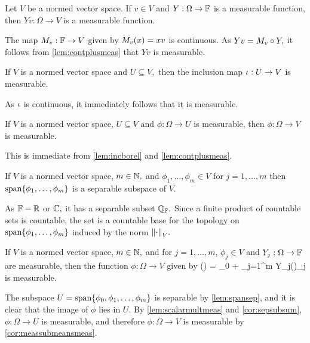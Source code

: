 \ble\label{lem:scalarmultmeas}
Let $V$ be a normed vector space. If $v \in V$ and $Y:\Omega\rightarrow \mathbb F$ is a measurable function, then $Yv:\Omega\rightarrow V$ is a measurable function.
\ele

The map $M_{v}:\mathbb F\rightarrow V$ given by $M_{v}(x) = xv$ is continuous. As $Yv = M_{v} \circ Y,$ it follows from \cref{lem:contplusmeas} that $Yv$ is measurable.
\epf

\ble\label{lem:incborel}
If $V$ is a normed vector space and $U \subseteq V,$ then the inclusion map $\iota:U\rightarrow V$ is measurable.
\ele

As $\iota$ is continuous, it immediately follows that it is measurable.
\epf

\bco\label{cor:meassubmeansmeas}
If $V$ is a normed vector space, $U\subseteq V$ and $\phi:\Omega\rightarrow U$ is measurable, then $\phi:\Omega\rightarrow V$ is measurable.
\eco

This is immediate from \cref{lem:incborel} and \cref{lem:contplusmeas}.
\epf

\ble\label{lem:spansep}
If $V$ is a normed vector space, $m \in \mathbb N,$ and $\phi_1,\ldots,\phi_m \in V$ for $j = 1,\ldots,m$ then $\spanset{\phi_1,\ldots,\phi_m}$ is a separable subspace of $V.$
\ele

As $\mathbb F = \mathbb R$ or $\mathbb C,$ it has a separable subset $\mathbb Q_{\mathbb F}.$ Since a finite product of countable sets is countable, the set
\beqs
{}
\eeqs
is a countable base for the topology on $\spanset{\phi_1,\ldots,\phi_m}$ induced by the norm $\NV{\cdot}.$ 
\epf

\ble\label{lem:summeas}
If $V$ is a normed vector space, $m \in \mathbb N,$ and for $j = 1,\ldots,m$, $\phi_j\in V$ and $Y_j : \Omega \rightarrow \mathbb F$ are measurable, then the function $\phi:\Omega\rightarrow V$ given by
\beqs
\phi(\omega) = \phi_0 + \sum_{j=1}^m Y_j(\omega)\phi_j
\eeqs
is measurable.
\ele

The subspace $U=\spanset{\phi_0,\phi_1,\ldots,\phi_m}$ is separable by \cref{lem:spansep}, and it is clear that the image of $\phi$ lies in $U.$ By \cref{lem:scalarmultmeas} and \cref{cor:sepsubsum}, $\phi:\Omega\rightarrow U$ is measurable, and therefore $\phi:\Omega\rightarrow V$ is measurable by \cref{cor:meassubmeansmeas}.
\epf

